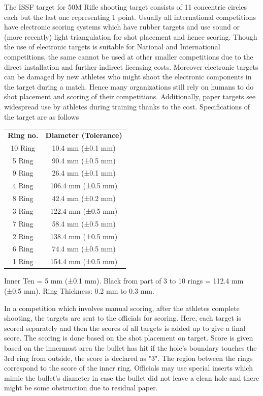 \documentclass[10pt,twocolumn,letterpaper]{article}
\begin{document}
The ISSF target for 50M Rifle shooting target consists of 11 concentric circles each but the last one representing 1 point. Usually all international competitions have electronic scoring systems which have rubber targets and use sound or (more recently) light triangulation for shot placement and hence scoring. Though the use of electronic targets is suitable for National and International competitions, the same cannot be used at other smaller competitions due to the direct installation and further indirect licensing costs. Moreover electronic targets can be damaged by new athletes who might shoot the electronic components in the target during a match. Hence many organizations still rely on humans to do shot placement and scoring of their competitions. Additionally, paper targets see widespread use by athletes during training thanks to the cost. Specifications of the target are as follows\cite{ISSFRuleBook-50MTargetSpecification}
\begin{center}
	\begin{tabular}{ c c }
		\textbf{Ring no.}  & \textbf{Diameter (Tolerance) }\\
		10 Ring & 10.4 mm (±0.1 mm)\\ 5 Ring &  90.4 mm (±0.5 mm)\\ 
		 9 Ring & 26.4 mm (±0.1 mm)\\ 4 Ring & 106.4 mm (±0.5 mm)\\ 
		 8 Ring & 42.4 mm (±0.2 mm)\\ 3 Ring & 122.4 mm (±0.5 mm)\\
		 7 Ring & 58.4 mm (±0.5 mm)\\ 2 Ring & 138.4 mm (±0.5 mm)\\
		 6 Ring & 74.4 mm (±0.5 mm)\\ 1 Ring & 154.4 mm (±0.5 mm)\\	
	\end{tabular}

Inner Ten = 5 mm (±0.1 mm).
Black from part of 3 to 10 rings = 112.4 mm (±0.5 mm).
Ring Thickness: 0.2 mm to 0.3 mm.
\end{center}

In a competition which involves manual scoring, after the athletes complete shooting, the targets are sent to the officials for scoring. Here, each target is scored separately and then the scores of all targets is added up to give a final score. The scoring is done based on the shot placement on target. Score is given based on the innermost area the bullet has hit \eg if the hole's boundary touches the 3rd ring from outside, the score is declared as "3". The region between the rings correspond to the score of the inner ring. Officials may use special inserts which mimic the bullet's diameter in case the bullet did not leave a clean hole and there might be some obstruction due to residual paper.
\end{document}
